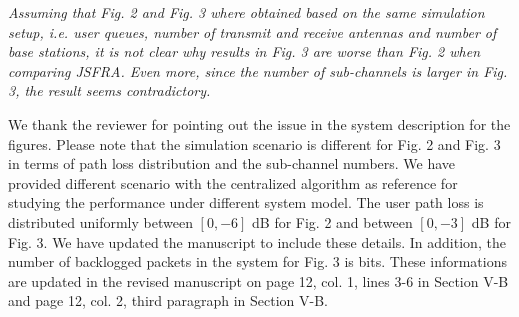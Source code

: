 \begin{itemize}
 \textit{Assuming that Fig. 2 and Fig. 3 where obtained based on the same simulation setup, i.e. user queues, number of transmit and receive antennas and number of base stations, it is not clear why results in Fig. 3 are worse than Fig. 2 when comparing JSFRA. Even more, since the number of sub-channels is larger in Fig. 3, the result seems contradictory.}

\resp We thank the reviewer for pointing out the issue in the system description for the figures. Please note that the simulation scenario is different for Fig. 2 and Fig. 3 in terms of path loss distribution and the sub-channel numbers. We have provided different scenario with the centralized algorithm as reference for studying the performance under different system model. The user path loss is distributed uniformly between $[0,-6]$ dB for Fig. 2 and between $[0,-3]$ dB for Fig. 3. We have updated the manuscript to include these details. In addition, the number of backlogged packets in the system for Fig. 3 is \me{[9,16,14,16,9,13,11,12]} bits. These informations are updated in the revised manuscript on page 12, col. 1, lines 3-6 in Section V-B and page 12, col. 2, third paragraph in Section V-B.

\end{itemize}

